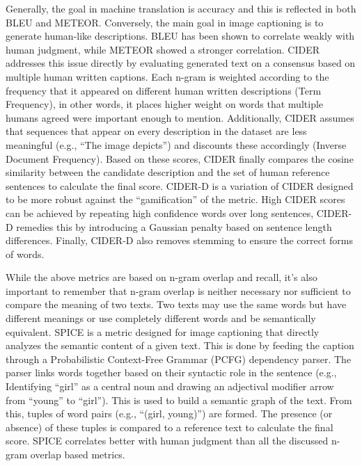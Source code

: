 Generally, the goal in machine translation is accuracy and this is reflected in both BLEU and METEOR. Conversely, the main goal in image captioning is to generate human-like descriptions. BLEU has been shown to correlate weakly with human judgment, while METEOR showed a stronger correlation. CIDER \autocite{vedantamCIDErConsensusBasedImage2015a} addresses this issue directly by evaluating generated text on a consensus based on multiple human written captions. Each n-gram is weighted according to the frequency that it appeared on different human written descriptions (Term Frequency), in other words, it places higher weight on words that multiple humans agreed were important enough to mention. Additionally, CIDER assumes that sequences that appear on every description in the dataset are less meaningful (e.g., ``The image depicts'') and discounts these accordingly (Inverse Document Frequency). Based on these scores, CIDER finally compares the cosine similarity between the candidate description and the set of human reference sentences to calculate the final score. CIDER-D is a variation of CIDER designed to be more robust against the ``gamification'' of the metric. High CIDER scores can be achieved by repeating high confidence words over long sentences, CIDER-D remedies this by introducing a Gaussian penalty based on sentence length differences. Finally, CIDER-D also removes stemming to ensure the correct forms of words.

While the above metrics are based on n-gram overlap and recall, it's also important to remember that n-gram overlap is neither necessary nor sufficient to compare the meaning of two texts. Two texts may use the same words but have different meanings or use completely different words and be semantically equivalent. SPICE \cite{andersonSPICESemanticPropositional2016} is a metric designed for image captioning that directly analyzes the semantic content of a given text. This is done by feeding the caption through a Probabilistic Context-Free Grammar (PCFG) dependency parser. The parser links words together based on their syntactic role in the sentence (e.g., Identifying ``girl'' as a central noun and drawing an adjectival modifier arrow from ``young'' to ``girl''). This is used to build a semantic graph of the text. From this, tuples of word pairs (e.g., ``(girl, young)'') are formed. The presence (or absence) of these tuples is compared to a reference text to calculate the final score. SPICE correlates better with human judgment than all the discussed n-gram overlap based metrics.

